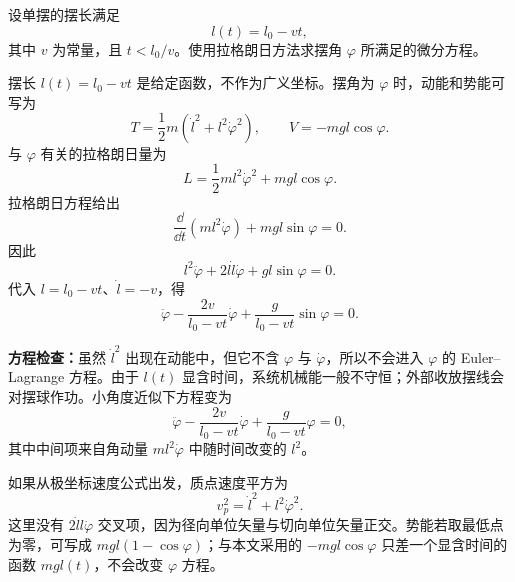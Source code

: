 \begin{question}[摆长线性变化的单摆]
设单摆的摆长满足
\[
  l(t)=l_0-vt,
\]
其中 $v$ 为常量，且 $t<l_0/v$。使用拉格朗日方法求摆角 $\varphi$ 所满足的微分方程。

\begin{solution}
摆长 $l(t)=l_0-vt$ 是给定函数，不作为广义坐标。摆角为 $\varphi$ 时，动能和势能可写为
\[
  T=\frac12m\left(\dot l^2+l^2\dot\varphi^2\right),
  \qquad
  V=-mgl\cos\varphi.
\]
与 $\varphi$ 有关的拉格朗日量为
\[
  L=\frac12ml^2\dot\varphi^2+mgl\cos\varphi.
\]
拉格朗日方程给出
\[
  \frac{\dd}{\dd t}\left(ml^2\dot\varphi\right)+mgl\sin\varphi=0.
\]
因此
\[
  l^2\ddot\varphi+2l\dot l\dot\varphi+gl\sin\varphi=0.
\]
代入 $l=l_0-vt$、$\dot l=-v$，得
\[
  \boxed{\ddot\varphi-\frac{2v}{l_0-vt}\dot\varphi
  +\frac{g}{l_0-vt}\sin\varphi=0}.
\]


\medskip
\textbf{方程检查：}虽然 $\dot l^2$ 出现在动能中，但它不含 $\varphi$ 与 $\dot\varphi$，所以不会进入 $\varphi$ 的 Euler--Lagrange 方程。由于 $l(t)$ 显含时间，系统机械能一般不守恒；外部收放摆线会对摆球作功。小角度近似下方程变为
\[
  \ddot\varphi-\frac{2v}{l_0-vt}\dot\varphi
  +\frac{g}{l_0-vt}\varphi=0,
\]
其中中间项来自角动量 $ml^2\dot\varphi$ 中随时间改变的 $l^2$。


\medskip
如果从极坐标速度公式出发，质点速度平方为
\[
  v_p^2=\dot l^2+l^2\dot\varphi^2.
\]
这里没有 $2\dot l l\dot\varphi$ 交叉项，因为径向单位矢量与切向单位矢量正交。势能若取最低点为零，可写成 $mgl(1-\cos\varphi)$；与本文采用的 $-mgl\cos\varphi$ 只差一个显含时间的函数 $mgl(t)$，不会改变 $\varphi$ 方程。
\end{solution}
\end{question}

